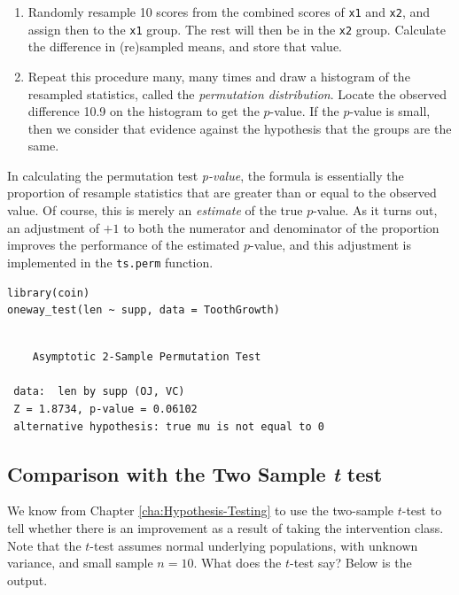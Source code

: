 \documentclass[captions=tableheading]{scrbook}
\begin{document}
\begin{example}
\begin{enumerate}
\item Randomly resample 10 scores from the combined scores of \texttt{x1} and \texttt{x2}, and assign then to the \texttt{x1} group. The rest will then be in the \texttt{x2} group. Calculate the difference in (re)sampled means, and store that value.
\item Repeat this procedure many, many times and draw a histogram of the resampled statistics, called the \emph{permutation distribution}. Locate the observed difference 10.9 on the histogram to get the \(p\)-value. If the \(p\)-value is small, then we consider that evidence against the hypothesis that the groups are the same.
\end{enumerate}


\end{example}

\begin{rem}
In calculating the permutation test \emph{p-value}, the formula is essentially the proportion of resample statistics that are greater than or equal to the observed value. Of course, this is merely an \emph{estimate} of the true \(p\)-value. As it turns out, an adjustment of \(+1\) to both the numerator and denominator of the proportion improves the performance of the estimated \(p\)-value, and this adjustment is implemented in the \texttt{ts.perm} function.
\end{rem}



\begin{verbatim}
library(coin)
oneway_test(len ~ supp, data = ToothGrowth)
\end{verbatim}

\begin{verbatim}
 
 	Asymptotic 2-Sample Permutation Test
 
 data:  len by supp (OJ, VC) 
 Z = 1.8734, p-value = 0.06102
 alternative hypothesis: true mu is not equal to 0
\end{verbatim}
\subsection{Comparison with the Two Sample \emph{t} test}
\label{sec-13-4-1}


We know from Chapter \ref{cha:Hypothesis-Testing} to use the two-sample \(t\)-test to tell whether there is an improvement as a result of taking the intervention class. Note that the \(t\)-test assumes normal underlying populations, with unknown variance, and small sample \(n=10\). What does the \(t\)-test say? Below is the output. 
\end{document}

